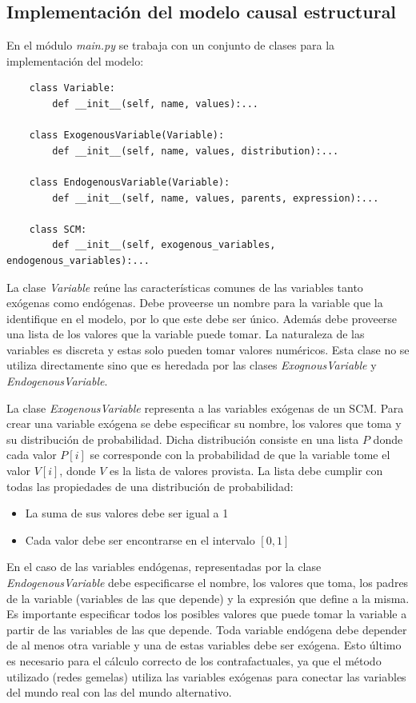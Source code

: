 \subsection{Implementación del modelo causal estructural}
En el módulo \textit{main.py} se trabaja con un conjunto de clases para la implementación del modelo:	  

\begin{lstlisting}
	class Variable:
		def __init__(self, name, values):...
	
	class ExogenousVariable(Variable):
		def __init__(self, name, values, distribution):...
	
	class EndogenousVariable(Variable):
		def __init__(self, name, values, parents, expression):...
	
	class SCM:
		def __init__(self, exogenous_variables, endogenous_variables):...
\end{lstlisting}

La clase \textit{Variable} reúne las características comunes de las variables tanto exógenas como endógenas. Debe proveerse un nombre para la variable que la identifique en el modelo, por lo que este debe ser único. Además debe proveerse una lista de los valores que la variable puede tomar. La naturaleza de las variables es discreta y estas solo pueden tomar valores numéricos. Esta clase no se utiliza directamente sino que es heredada por las clases \textit{ExognousVariable} y \textit{EndogenousVariable}. 

La clase \textit{ExogenousVariable} representa a las variables exógenas de un SCM. Para crear una variable exógena se debe especificar su nombre, los valores que toma y su distribución de probabilidad. Dicha distribución consiste en una lista $P$ donde cada valor $P[i]$ se corresponde con la probabilidad de que la variable tome el valor $V[i]$, donde $V$ es la lista de valores provista. La lista debe cumplir con todas las propiedades de una distribución de probabilidad:
\begin{itemize}
	\item La suma de sus valores debe ser igual a 1
	\item Cada valor debe ser encontrarse en el intervalo $[0,1]$
\end{itemize}

En el caso de las variables endógenas, representadas por la clase \textit{EndogenousVariable} debe especificarse el nombre, los valores que toma, los padres de la variable (variables de las que depende) y la expresión que define a la misma. Es importante especificar todos los posibles valores que puede tomar la variable a partir de las variables de las que depende. Toda variable endógena debe depender de al menos otra variable y una de estas variables debe ser exógena. Esto último es necesario para el cálculo correcto de los contrafactuales, ya que el método utilizado (redes gemelas) utiliza las variables exógenas para conectar las variables del mundo real con las del mundo alternativo.


